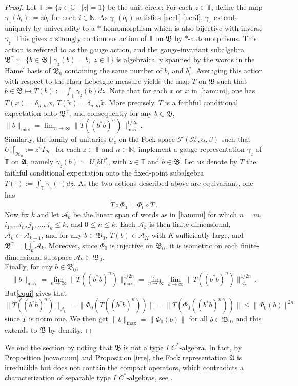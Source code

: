 \documentclass[12pt]{amsart}
\numberwithin{equation}{section}
\def\cf{{\mathcal F}}
\def\ch{{\mathcal H}}
\def\ga{{\mathfrak A}} \def\gpa{{\mathfrak a}}
\def\gb{{\mathfrak B}}\def\gpb{{\mathfrak b}}
\def\bc{{\mathbb C}}
\def\bn{{\mathbb N}}
\def\bt{{\mathbb T}}
\def\a{\alpha}
\def\b{\beta}
\def\g{\gamma}  \def\G{\Gamma}
\def\d{\delta}  \def\D{\Delta}
\theoremstyle{definition}
\begin{document}
\begin{proof}
Let $\bt:=\{z\in\bc\mid |z|=1\}$ be the unit circle: For each  $z\in\bt$, define the map $\g_z(b_i):=z b_i$ for each $i\in\bn$. As $\g_z(b_i)$ satisfies \eqref{ucr1}-\eqref{ucr3}, $\g_z$ extends uniquely by universality to a $*$-homomorphism which is also bijective with inverse $\g_{\overline{z}}$. This gives a strongly continuous action of $\bt$ on $\gb$ by $*$-automorphisms. This action is referred to as the gauge action, and the gauge-invariant subalgebra $\gb^\g:=\{b\in\gb\mid \g_z(b)=b,\,\,z\in\bt\}$ is algebraically spanned by the words in the Hamel basis of $\gb_0$ containing the same number of $b_i$ and $b_i^*$. Averaging this action with respect to the Haar-Lebesgue measure yields the map $T$ on $\gb$ such that $b\in\gb\mapsto T(b):=\int_{\mathbb T} \g_z(b) dz$. Note that for each $x$ or $\widetilde{x}$ in \eqref{hamuni}, one has $T(x)=\d_{n,m}x$, $T(\widetilde{x})=\d_{n,m}\widetilde{x}$. More precisely, $T$ is a faithful conditional expectation onto $\gb^\g$, and consequently for any $b\in \gb$, $\|b\|_{\max}=\lim_{n\to \infty} \|T((b^*b)^n)\|_{\max}^{1/2n}$.\\
Similarly, the family of unitaries $U_z$ on the Fock space $\cf(\ch,\a,\b)$ such
that $U_z\lceil_{\ch_n}:=z^n I_{\ch_n}$ for each $z\in\bt$ and
$n\in\bn$, implement a gauge representation $\widetilde{\g}_z$ of
$\bt$ on $\ga$, namely $\widetilde{\g}_z(b):=U_zbU_z^*$, with
$z\in\bt$ and $b\in\gb$. Let us denote by $\widetilde{T}$ the faithful
conditional expectation onto the fixed-point subalgebra
$\widetilde{T}(\cdot):=\int_{\bt}\widetilde{\g}_z(\cdot)dz$. As the
two actions described above are equivariant, one has
\begin{equation}\label{equi}
\widetilde{T}\circ \Phi_0=\Phi_0\circ T\,.
\end{equation}
Now fix $k$ and let $\mathcal{A}_k$ be the linear span of words as in \eqref{hamuni} for which $n=m$, $i_1,\ldots i_n,j_1,\ldots,j_n\leq k$, and $0\leq n\leq k$. Each $\mathcal{A}_k$ is then finite-dimensional, $\mathcal{A}_k\subset \mathcal{A}_{k+1}$, and for any $b\in\gb_0$, $T(b)\in\mathcal{A}_K$ with $K$ sufficiently large, and $\gb^\g=\overline{\bigcup_k \mathcal{A}_k}$. Moreover, since $\Phi_0$ is injective on $\gb_0$, it is isometric on each finite-dimensional subspace $\mathcal A_k\subset\gb_0$. \\
Finally, for any $b\in \gb_0$,
$$
\|b\|_{\max}=\lim_{n\to \infty} \|T((b^*b)^n)\|_{\max}^{1/2n}=
  \lim_{n\to \infty}\lim_{k\to \infty} \|T((b^*b)^n)\|_{\mathcal A_k}^{1/2n}\,.
$$
But\eqref{equi} gives that
$$
\|T((b^*b)^n)\|_{\mathcal A_k}=\|\Phi_0(T((b^*b)^n))\|
  =\|\tilde T(\Phi_0((b^*b)^n))\|\leq \|\Phi_0(b)\|^{2n}\,
$$
since $\tilde T$ is norm one. We then get $\|b\|_{\max}=\|\Phi_0(b)\|$ for all $b\in \gb_0$, and this extends to $\gb$ by density.
\end{proof}
We end the section by noting that $\gb$ is not a type $I$ $C^*$-algebra. In fact, by Proposition \ref{novacuum} and Proposition \ref{irre}, the Fock representation $\ga$ is irreducible but does not contain the compact operators, which contradicts a characterization of separable type $I$ $C^*$-algebras, see \cite{Gli}.
\end{document}
